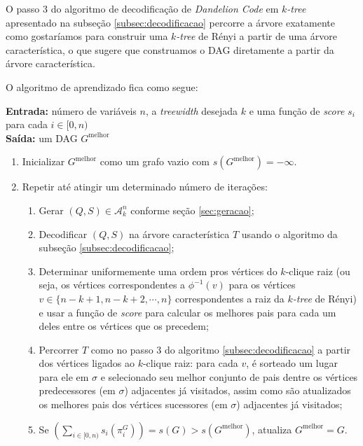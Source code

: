 O passo 3 do algoritmo de decodificação de \emph{Dandelion Code} em \emph{$k$-tree} apresentado na subseção \ref{subsec:decodificacao} percorre a árvore exatamente como gostaríamos para construir uma \emph{$k$-tree} de Rényi a partir de uma árvore característica, o que sugere que construamos o DAG diretamente a partir da árvore característica.

O algoritmo de aprendizado fica como segue:

\begin{algorithm}
  \textbf{Entrada:} número de variáveis $n$, a \emph{treewidth} desejada $k$ e uma função de \emph{score} $s_i$ para cada $i \in [0, n)$\\
  \textbf{Saída:} um DAG $G^{\text{melhor}}$

  \begin{enumerate}
    \item Inicializar $G^{\text{melhor}}$ como um grafo vazio com $s(G^{\text{melhor}}) = -\infty$.
    \item Repetir até atingir um determinado número de iterações:
      \begin{enumerate}
        \item Gerar $(Q, S) \in \mathcal{A}^n_k$ conforme seção \ref{sec:geracao};
        \item Decodificar $(Q, S)$ na árvore característica $T$ usando o algoritmo da subseção \ref{subsec:decodificacao};
        \item Determinar uniformemente uma ordem pros vértices do $k$-clique raiz (ou seja, os vértices correspondentes a $\phi^{-1}(v)$ para os vértices $v \in \{n-k+1, n-k+2, \cdots, n\}$ correspondentes a raiz da \emph{$k$-tree} de Rényi) e usar a função de \emph{score} para calcular os melhores pais para cada um deles entre os vértices que os precedem;
        \item Percorrer $T$ como no passo 3 do algoritmo \ref{subsec:decodificacao} a partir dos vértices ligados ao $k$-clique raiz: para cada $v$, é sorteado um lugar para ele em $\sigma$ e selecionado seu melhor conjunto de pais dentre os vértices predecessores (em $\sigma$) adjacentes já visitados, assim como são atualizados os melhores pais dos vértices sucessores (em $\sigma$) adjacentes já visitados;
        \item Se $\left(\sum_{i \in [0,n)} s_i(\pi^G_{i})\right) = s(G) > s(G^{\text{melhor}})$, atualiza $G^{\text{melhor}} = G$.
      \end{enumerate}
  \end{enumerate}
\end{algorithm}

